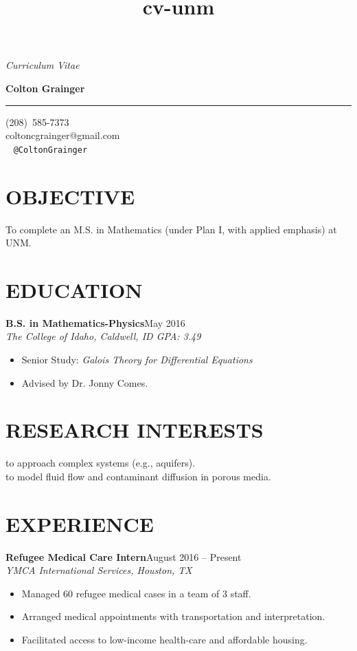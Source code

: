 \documentclass[margin]{res}
\title{cv-unm}
\newcommand\textbox[1]{\parbox{.333\textwidth}{#1} }
\newcommand\job[3]{\textbf{#1}\hfill {#2}\\ \emph{#3} }
\newcommand\degree[3]{\textbf{#1}\hfill {#2}\\ \emph{#3} }
\newenvironment{details}{\begin{itemize}[itemsep=0.6pt,topsep=2.2pt] }{\end{itemize} }
\begin{document}
 

\noindent\textbox{{\it Curriculum Vitae }\hfill } \textbox{\hfill{\large\bf Colton Grainger}\hfill }

\vspace{-20pt}
\rule{\textwidth}{1pt}

\vspace{-20pt}
\begin{flushright} 
(208)~585-7373\\ coltoncgrainger@gmail.com\\ \faTwitter\ \faGithub\hspace{1ex} {\tt @ColtonGrainger} 
\end{flushright}
\vspace{-24pt}

\begin{resume}

\section{OBJECTIVE}
To complete an M.S. in Mathematics (under Plan I, with applied emphasis) at UNM.

\section{EDUCATION}
\degree{B.S. in Mathematics-Physics}{May 2016}{The College of Idaho, Caldwell, ID \hfill {\rm GPA: 3.49}}
    \begin{details}
   		\item Senior Study: \emph{Galois Theory for Differential Equations}
        \item Advised by Dr. Jonny Comes.
    \end{details}

\section{RESEARCH INTERESTS}

 to approach complex systems (e.g., aquifers).\\
 to model fluid flow and contaminant diffusion in porous media.

\section{EXPERIENCE}
\job{Refugee Medical Care Intern}{August 2016 -- Present}{YMCA International Services, Houston, TX}
    \begin{details}
	  	\item Managed 60 refugee medical cases in a team of 3 staff.
        \item Arranged medical appointments with transportation and interpretation.
        \item Facilitated access to low-income health-care and affordable housing.
	\end{details}
     

\end{resume}
\end{document}
